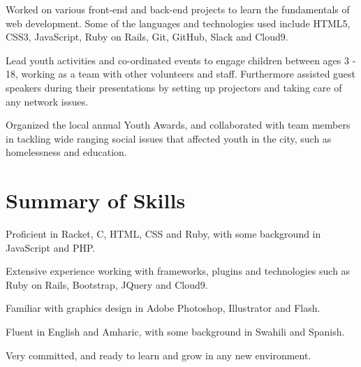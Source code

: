 \documentclass[letterpaper]{deedy-resume}
\begin{document}
\begin{minipage}[t]{0.66\textwidth}
Worked on various front-end and back-end projects to learn the fundamentals of web development. 
Some of the languages and technologies used include HTML5, CSS3, JavaScript, Ruby on Rails, Git, GitHub, Slack and Cloud9.

\sectionspace 



Lead youth activities and co-ordinated events to engage children between ages 3 - 18, working as a team with other volunteers and staff. Furthermore assisted guest speakers during their presentations by setting up projectors and taking care of any network issues. 

\sectionspace 



Organized the local annual Youth Awards, and collaborated with team members in tackling wide ranging social issues that affected youth in the city, such as homelessness and education.

\sectionspace 




\section{Summary of Skills}
\vspace{\topsep} 
\begin{tightitemize}
\item Proficient in Racket, C, HTML, CSS and Ruby, with some background in JavaScript and PHP.
\item Extensive experience working with frameworks, plugins and technologies such as Ruby on Rails, Bootstrap, JQuery and Cloud9.
\item Familiar with graphics design in Adobe Photoshop, Illustrator and Flash.
\item Fluent in English and Amharic, with some background in Swahili and Spanish.
\item Very committed, and ready to learn and grow in any new environment.
\end{tightitemize}



\end{minipage}
\end{document}
